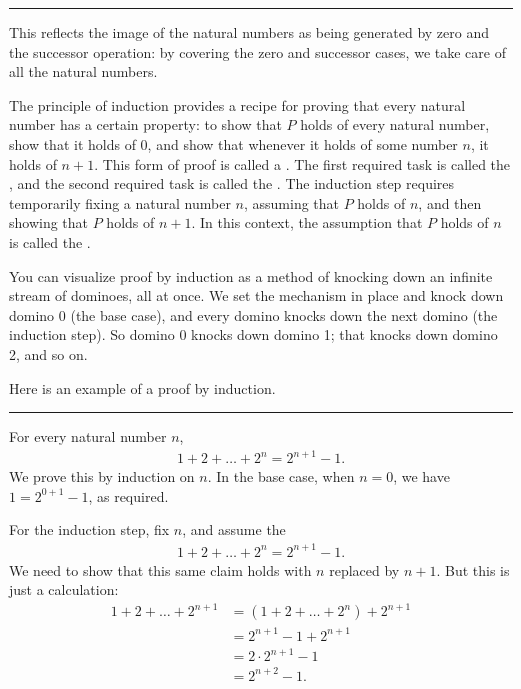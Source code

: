 \documentclass[letterpaper,10pt,english]{sphinxmanual}
\begin{document}
\bigskip\hrule\bigskip


\sphinxAtStartPar
This reflects the image of the natural numbers as being generated by zero and the successor operation: by covering the zero and successor cases, we take care of all the natural numbers.

\sphinxAtStartPar
The principle of induction provides a recipe for proving that every natural number has a certain property: to show that \(P\) holds of every natural number, show that it holds of \(0\), and show that whenever it holds of some number \(n\), it holds of \(n + 1\). This form of proof is called a . The first required task is called the , and the second required task is called the . The induction step requires temporarily fixing a natural number \(n\), assuming that \(P\) holds of \(n\), and then showing that \(P\) holds of \(n + 1\). In this context, the assumption that \(P\) holds of \(n\) is called the .

\sphinxAtStartPar
You can visualize proof by induction as a method of knocking down an infinite stream of dominoes, all at once. We set the mechanism in place and knock down domino 0 (the base case), and every domino knocks down the next domino (the induction step). So domino 0 knocks down domino 1; that knocks down domino 2, and so on.

\sphinxAtStartPar
Here is an example of a proof by induction.


\bigskip\hrule\bigskip


\sphinxAtStartPar
{} For every natural number \(n\),
\begin{equation*}
\begin{split}1 + 2 + \ldots + 2^n = 2^{n+1} - 1.\end{split}
\end{equation*}
\sphinxAtStartPar
{} We prove this by induction on \(n\). In the base case, when \(n = 0\), we have \(1 = 2^{0+1} - 1\), as required.

\sphinxAtStartPar
For the induction step, fix \(n\), and assume the 
\begin{equation*}
\begin{split}1 + 2 + \ldots + 2^n = 2^{n+1} - 1.\end{split}
\end{equation*}
\sphinxAtStartPar
We need to show that this same claim holds with \(n\) replaced by \(n + 1\). But this is just a calculation:
\begin{equation*}
\begin{split}1 + 2 + \ldots + 2^{n+1} & = (1 + 2 + \ldots + 2^n) + 2^{n+1} \\
& = 2^{n+1} - 1 + 2^{n+1} \\
& = 2 \cdot 2^{n+1} - 1 \\
& = 2^{n+2} - 1.\end{split}
\end{equation*}
\end{document}
